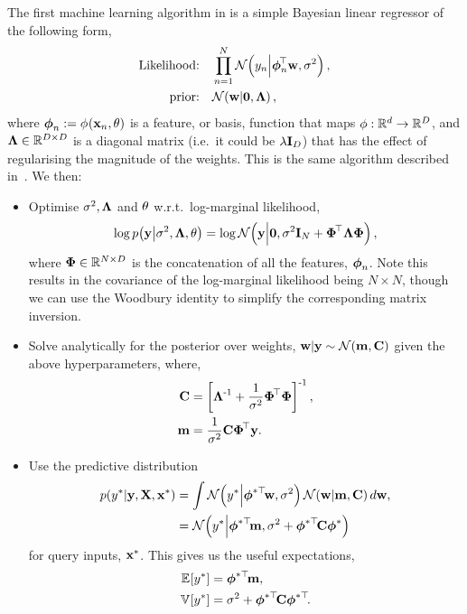 \documentclass[11pt, oneside]{article}
\begin{document}
The first machine learning algorithm in \revrand is a simple Bayesian linear
regressor of the following form,
\begin{align}
    \text{Likelihood:} \quad &\prod^N_{n=1} 
    \gausC{\targs_n}{\feats_n\T\weights, \var}, \\
    \text{prior:} \quad &\gausC{\weights}{\mathbf{0}, \Reg},
\end{align}
where $\feats_n := \func{\featsym}{\inss_n, \param}{}$ is a feature, or basis,
function that maps $\featsym : \real{d} \to \real{D}$, and $\Reg \in
\real{D\times D}$ is a diagonal matrix (i.e.~it could be $\reg\ident{D}$) that
has the effect of regularising the magnitude of the weights. This is the same
algorithm described in~\citet[Chapter 2]{Rasmussen2006}. We then:
\begin{itemize}
    \item Optimise $\var, \Reg$ and $\param$ w.r.t.\ log-marginal likelihood,
        \begin{equation}
            \log \probC{\targ}{\var, \Reg, \param} =
            \log \gausC{\targ}{\mathbf{0}, \var\ident{N} + \feat\T\Reg\feat},
        \end{equation}
        where $\feat \in \real{N \times D}$ is the concatenation of all the
        features, $\feats_n$. Note this results in the covariance of the
        log-marginal likelihood being $N \times N$, though we can use the
        Woodbury identity to simplify the corresponding matrix inversion.
    \item Solve analytically for the posterior over weights, $\weights | \targ
        \sim \gaus{\pomean, \pocov}$ given the above hyperparameters, where,
        \begin{align*}
            \pocov &= \sbrac{\Reg\inv + \frac{1}{\var}
                \feat\T \feat}\inv, \\
            \pomean &= \frac{1}{\var} \pocov \feat\T \targ.
        \end{align*}
    \item Use the predictive distribution
        \begin{align}
            \probC{\targs\test}{\targ, \ins, \inss\test} &= \int
            \gausC{\targs\test}{\feats\testT\weights, \var}
            \gausC{\weights}{\pomean, \pocov} d\weights, \nonumber \\
            &= \gausC{\targs\test}{\feats\testT \pomean,
                \var + \feats\testT \pocov \feats\test}
        \end{align}
        for query inputs, $\inss\test$. This gives us the useful expectations,
        \begin{align}
            \expece{}{\targs\test} &= \feats\testT\pomean, \\
            \evar{}{\targs\test} &= \var + \feats\testT\pocov\feats\testT.
        \end{align}
\end{itemize}
\end{document}
